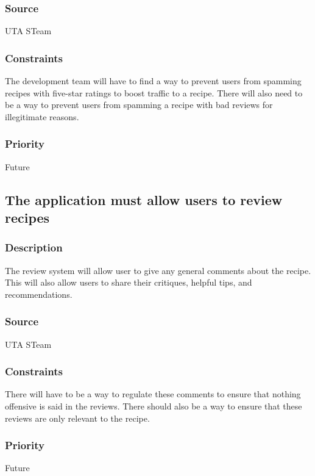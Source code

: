 \subsubsection{Source}
UTA STeam
\subsubsection{Constraints}
The development team will have to find a way to prevent users from spamming recipes with five-star ratings to boost traffic to a recipe. There will also need to be a way to prevent users from spamming a recipe with bad reviews for illegitimate reasons.
\subsubsection{Priority}
Future

\subsection{The application must allow users to review recipes}
\subsubsection{Description}
The review system will allow user to give any general comments about the recipe. This will also allow users to share their critiques, helpful tips, and recommendations. 
\subsubsection{Source}
UTA STeam
\subsubsection{Constraints}
There will have to be a way to regulate these comments to ensure that nothing offensive is said in the reviews. There should also be a way to ensure that these reviews are only relevant to the recipe.
\subsubsection{Priority}
Future

